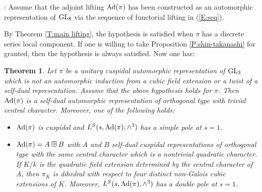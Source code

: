 \documentclass[11pt]{amsart}
\theoremstyle{plain}
\newtheorem{thm}[equation]{Theorem}
\numberwithin{equation}{section}
\def\GL{{\rm GL}}
\begin{document}
: 
Assume that the adjoint lifting ${\rm Ad}(\pi)$ has been constructed as an automorphic representation of $\GL_8$ via the sequence of functorial lifting in (\ref{E:seq}). 
\vskip 5pt

\noindent By Theorem \ref{T:main lifting}, the hypothesis is satisfied when $\pi$ has a discrete series local component. 
If one is willing to take Proposition \ref{P:shin-takanashi} for granted, then the hypothesis is always satisfied.
Now one has:
 
\vskip 5pt

\begin{thm} \label{T:cuspidality}
Let $\pi$ be a unitary cuspidal automorphic representation of $\GL_3$ which is not an automorphic induction from a cubic field extension or a twist of a self-dual representation. 
Assume that the above hypothesis holds for $\pi$. Then ${\rm Ad}(\pi)$ is a self-dual automorphic representation of orthogonal type with trivial central character. Moreover,
 one of the following holds:
\vskip 5pt
\begin{itemize}
\item[(i)]  ${\rm Ad}(\pi)$ is  cuspidal  and $L^S(s, {\rm Ad}(\pi), \wedge^3)$ has a simple pole at $s=1$.
\vskip 5pt

\item[(ii)]  ${\rm Ad}(\pi) = A \boxplus B$ with $A$ and $B$ self-dual cuspidal representations of orthogonal type with the same  central character which is a nontrivial quadratic character. If $K/k$ is the quadratic field extension determined by the central character of $A$,  then
$\pi_K$ is dihedral with respect to four distinct non-Galois cubic extensions of $K$.  Moreover, $L^S(s, {\rm Ad}(\pi), \wedge^3)$ has a double pole at $s=1$.
\end{itemize}
\end{thm}
\vskip 5pt
\end{document}
